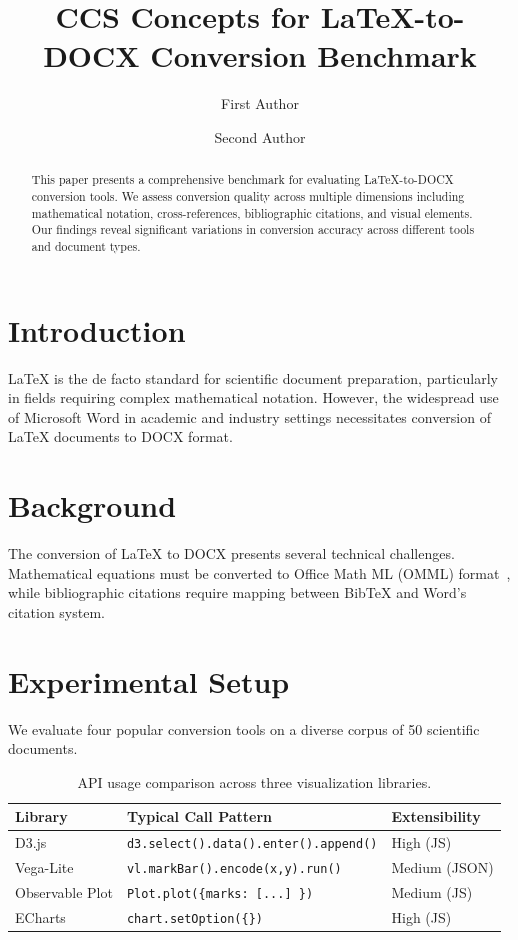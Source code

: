 \documentclass[sigconf,anonymous,review]{acmart}
\title{CCS Concepts for LaTeX-to-DOCX Conversion Benchmark}
\author{First Author}
\affiliation{\institution{Example University}
  \city{City} \country{Country}}
\author{Second Author}
\affiliation{\institution{Another Institute}
  \city{City} \country{Country}}
\begin{document}
\maketitle

\begin{abstract}
This paper presents a comprehensive benchmark for evaluating LaTeX-to-DOCX
conversion tools. We assess conversion quality across multiple dimensions including
mathematical notation, cross-references, bibliographic citations, and visual elements.
Our findings reveal significant variations in conversion accuracy across different tools
and document types.
\end{abstract}


\section{Introduction}

LaTeX is the de facto standard for scientific document preparation, particularly
in fields requiring complex mathematical notation. However, the widespread use
of Microsoft Word in academic and industry settings necessitates conversion of
LaTeX documents to DOCX format.

\section{Background}

The conversion of LaTeX to DOCX presents several technical challenges. Mathematical
equations must be converted to Office Math ML (OMML) format~\cite{lamport1994latex},
while bibliographic citations require mapping between BibTeX and Word's citation system.

\section{Experimental Setup}

We evaluate four popular conversion tools on a diverse corpus of 50 scientific documents.

\begin{table}[t]
\caption{API usage comparison across three visualization libraries.}
\label{tab:api}
\begin{tabular}{l|p{4.5cm}|p{3.5cm}}
  \toprule
  Library & Typical Call Pattern & Extensibility \\
  \midrule
  D3.js & \texttt{d3.select().data().enter().append()} & High (JS) \\
  Vega-Lite & \texttt{vl.markBar().encode(x,y).run()} & Medium (JSON) \\
  Observable Plot & \texttt{Plot.plot(\{marks: [...] \})} & Medium (JS) \\
  ECharts & \texttt{chart.setOption(\{\})} & High (JS) \\
  \bottomrule
\end{tabular}
\end{table}
\end{document}

